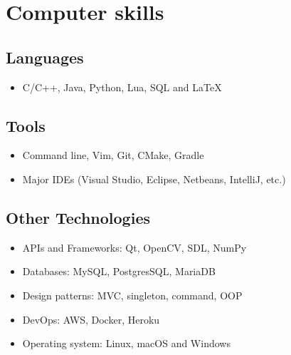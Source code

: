 \documentclass[10pt, letterpaper]{article}
\begin{document}
\section{Computer skills}
\begin{multicols}{2}
  \begin{minipage}{0.5\textwidth}
    \subsection{Languages}
    \begin{footnotesize}
      \begin{itemize}
        \item
          C/C++, Java, Python, Lua, SQL and \LaTeX
      \end{itemize}
    \end{footnotesize}
    \medskip

    \subsection{Tools}
    \begin{footnotesize}
      \begin{itemize}
        \item
          Command line, Vim, Git, CMake, Gradle
        \item
          Major IDEs (Visual Studio, Eclipse, Netbeans, IntelliJ, etc.)
      \end{itemize}
    \end{footnotesize}
  \end{minipage}
  \columnbreak%

  \begin{minipage}{0.5\textwidth}
    \subsection{Other Technologies}
    \begin{footnotesize}
      \begin{itemize}
        \item
          APIs and Frameworks: Qt, OpenCV, SDL, NumPy
        \item
          Databases: MySQL, PostgresSQL, MariaDB
        \item
          Design patterns: MVC, singleton, command, OOP
        \item
          DevOps: AWS, Docker, Heroku
        \item
          Operating system: Linux, macOS and Windows
      \end{itemize}
    \end{footnotesize}
  \end{minipage}
\end{multicols}
\end{document}
